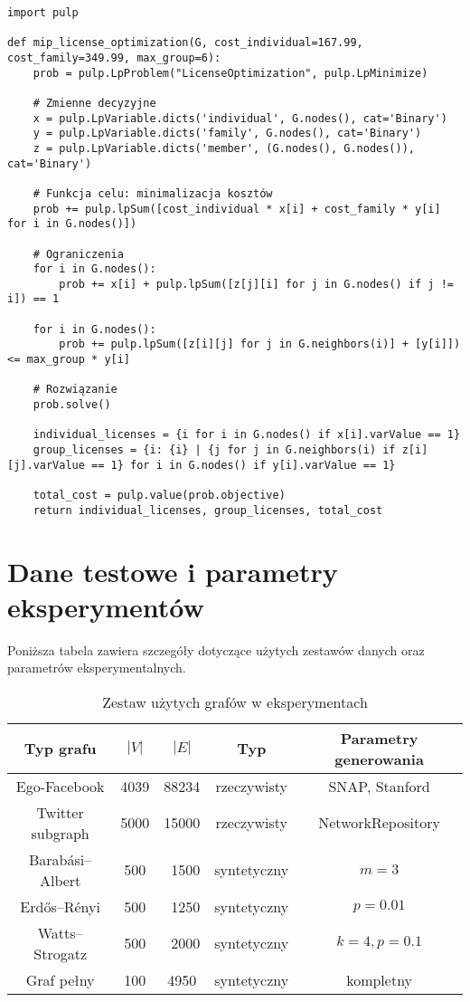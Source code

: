 \begin{verbatim}
import pulp

def mip_license_optimization(G, cost_individual=167.99, cost_family=349.99, max_group=6):
    prob = pulp.LpProblem("LicenseOptimization", pulp.LpMinimize)

    # Zmienne decyzyjne
    x = pulp.LpVariable.dicts('individual', G.nodes(), cat='Binary')
    y = pulp.LpVariable.dicts('family', G.nodes(), cat='Binary')
    z = pulp.LpVariable.dicts('member', (G.nodes(), G.nodes()), cat='Binary')

    # Funkcja celu: minimalizacja kosztów
    prob += pulp.lpSum([cost_individual * x[i] + cost_family * y[i] for i in G.nodes()])

    # Ograniczenia
    for i in G.nodes():
        prob += x[i] + pulp.lpSum([z[j][i] for j in G.nodes() if j != i]) == 1

    for i in G.nodes():
        prob += pulp.lpSum([z[i][j] for j in G.neighbors(i)] + [y[i]]) <= max_group * y[i]

    # Rozwiązanie
    prob.solve()

    individual_licenses = {i for i in G.nodes() if x[i].varValue == 1}
    group_licenses = {i: {i} | {j for j in G.neighbors(i) if z[i][j].varValue == 1} for i in G.nodes() if y[i].varValue == 1}

    total_cost = pulp.value(prob.objective)
    return individual_licenses, group_licenses, total_cost
\end{verbatim}

\section{Dane testowe i parametry eksperymentów}

Poniższa tabela zawiera szczegóły dotyczące użytych zestawów danych oraz parametrów eksperymentalnych.

\begin{table}[h]
\centering
\begin{tabular}{|c|c|c|c|c|}
\hline
\textbf{Typ grafu} & \(|V|\) & \(|E|\) & \textbf{Typ} & \textbf{Parametry generowania} \\
\hline
Ego-Facebook & 4039 & 88234 & rzeczywisty & SNAP, Stanford \\
Twitter subgraph & 5000 & 15000 & rzeczywisty & NetworkRepository \\
Barabási–Albert & 500 & ~1500 & syntetyczny & \(m=3\) \\
Erdős–Rényi & 500 & ~1250 & syntetyczny & \(p=0.01\) \\
Watts–Strogatz & 500 & ~2000 & syntetyczny & \(k=4, p=0.1\) \\
Graf pełny & 100 & 4950 & syntetyczny & kompletny \\
\hline
\end{tabular}
\caption{Zestaw użytych grafów w eksperymentach}
\end{table}


